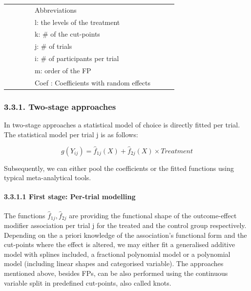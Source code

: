 \documentclass[14pt,]{article}
\let\oldparagraph\paragraph
\renewcommand{\paragraph}[1]{\oldparagraph{#1}\mbox{}}
\begin{document}
\begin{table}[t]
{\begin{tabular}{>{\bfseries\raggedright\arraybackslash}p{10em}>{\raggedright\arraybackslash}p{10em}>{\raggedright\arraybackslash}p{6em}>{\raggedright\arraybackslash}p{10em}llll}
 &  &  &  & Abbreviations &  &  & \\
\rowcolor{gray!6}   &  &  &  & l: the levels of the treatment &  &  & \\
 &  &  &  & k: \# of the cut-points &  &  & \\
\addlinespace
\rowcolor{gray!6}   &  &  &  & j: \# of trials &  &  & \\
 &  &  &  & i: \# of participants per trial &  &  & \\
\rowcolor{gray!6}   &  &  &  & m: order of the FP &  &  & \\
 &  &  &  & Coef : Coefficients with random effects &  &  & \\
\bottomrule
\end{tabular}}
\end{table}

\hypertarget{two-stage-approaches}{%
\subsubsection{3.3.1. Two-stage approaches}\label{two-stage-approaches}}

In two-stage approaches a statistical model of choice is directly fitted
per trial. The statistical model per trial j is as follows:

\[g(Y_{ij}) = \hat f_{1j}(X)  + \hat f_{2j}(X) \times Treatment\]

\begin{flushright} [1] \end{flushright}

Subsequently, we can either pool the coefficients or the fitted
functions using typical meta-analytical tools.

\hypertarget{first-stage-per-trial-modelling}{%
\paragraph{3.3.1.1 First stage: Per-trial
modelling}\label{first-stage-per-trial-modelling}}

The functions \(\hat f_{1j}, \hat f_{2j}\) are providing the functional
shape of the outcome-effect modifier association per trial j for the
treated and the control group respectively. Depending on the a priori
knowledge of the association's functional form and the cut-points where
the effect is altered, we may either fit a generalised additive model
with splines included, a fractional polynomial model or a polynomial
model (including linear shapes and categorised variable). The approaches
mentioned above, besides FPs, can be also performed using the continuous
variable split in predefined cut-points, also called knots.
\end{document}
